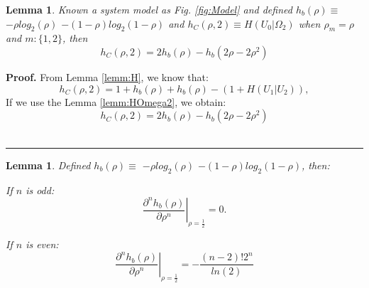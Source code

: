 \documentclass[a4paper,10pt]{article}
\newtheorem{mylemma}[mytheorem]{Lemma}
\newenvironment{myproof}[1][Proof]{\textbf{#1.} }{\ \rule{0.5em}{0.5em}}
\begin{document}
\begin{mdframed}[style=MDFStyGrayScreen]
\begin{mylemma}
 \label{lemm:h0Omega2}
 Known a system model as Fig. \ref{fig:Model} and defined $h_{b}(\rho) \equiv$ 
 $-\rho log_2(\rho)$ $-(1-\rho) log_2(1-\rho)$ and 
 $h_{C}(\rho,2)\equiv H(U_0|\Omega_2)$ when $\rho_m=\rho$ and $m:\{1,2\}$, then
  \begin{equation}\label{eq:h0Omega2}
h_{C}(\rho,2) = 2 h_{b}(\rho) - h_{b}(2\rho-2\rho^2)
\end{equation}
\end{mylemma}
\end{mdframed}

\begin{myproof}\label{proof:h0Omega2}
From Lemma \ref{lemm:H}, we know that:
\begin{equation}\label{eq:h0Omega2_1}
h_{C}(\rho,2) = 1+ h_{b}(\rho)+ h_{b}(\rho) - (1+ H(U_1|U_2)),
\end{equation}
If we use the Lemma \ref{lemm:HOmega2}, we obtain:
\begin{equation}\label{eq:h0Omega2_2}
h_{C}(\rho,2) = 2 h_{b}(\rho) - h_{b}(2\rho-2\rho^2)
\end{equation}
\end{myproof}


\begin{mdframed}[style=MDFStyGrayScreen]
\begin{mylemma}
 \label{lemm:Dnhrho}
 Defined $h_{b}(\rho) \equiv$ 
 $-\rho log_2(\rho)$ $-(1-\rho) log_2(1-\rho)$, then:
 
 If $n$ is odd:
\begin{equation}\label{eq:Dnhrho_0}
\left. \frac{\partial^n  h_{b}(\rho)}{\partial \rho^n}\right|_{\rho=\frac{1}{2}} = 0.
\end{equation}

 If $n$ is even:
\begin{equation}\label{eq:Dnhrho_1}
\left. \frac{\partial^n  h_{b}(\rho)}{\partial \rho^n}\right|_{\rho=\frac{1}{2}} =-\frac{(n-2)!2^n}{ln(2)}
\end{equation}
\end{mylemma}
\end{mdframed}
\end{document}
